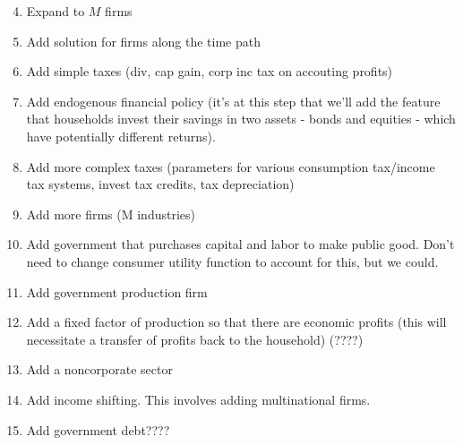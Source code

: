 \documentclass[letterpaper,12pt]{article}
\theoremstyle{definition}
\begin{document}
\begin{spacing}{1.5}
\begin{enumerate}
\setcounter{enumi}{3}
\item Expand to $M$ firms
\item Add solution for firms along the time path
\item Add simple taxes (div, cap gain, corp inc tax on accouting profits)
\item Add endogenous financial policy (it's at this step that we'll add the feature that households invest their savings in two assets - bonds and equities - which have potentially different returns).
\item Add more complex taxes (parameters for various consumption tax/income tax systems, invest tax credits, tax depreciation)
\item Add more firms (M industries)
\item Add government that purchases capital and labor to make public good.  Don't need to change consumer utility function to account for this, but we could.
\item Add government production firm
\item Add a fixed factor of production so that there are economic profits (this will necessitate a transfer of profits back to the household) (????)
\item Add a noncorporate sector
\item Add income shifting.  This involves adding multinational firms.
\item Add government debt????
\end{enumerate}


\end{spacing}
\end{document}
